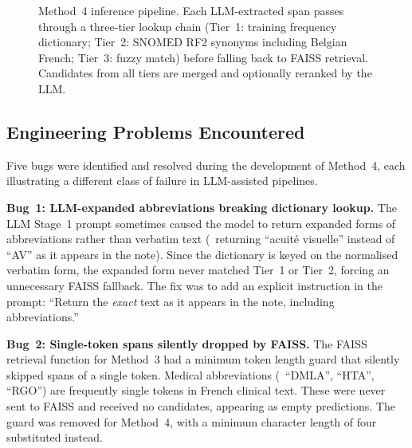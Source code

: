 \begin{figure}[htbp]
\caption{Method~4 inference pipeline. Each LLM-extracted span passes through a three-tier lookup chain (Tier~1: training frequency dictionary; Tier~2: SNOMED RF2 synonyms including Belgian French; Tier~3: fuzzy match) before falling back to FAISS retrieval. Candidates from all tiers are merged and optionally reranked by the LLM.}
\label{fig:m4_architecture}
\end{figure}

\subsection{Engineering Problems Encountered}

Five bugs were identified and resolved during the development of Method~4, each illustrating a different class of failure in LLM-assisted pipelines.

\textbf{Bug~1: LLM-expanded abbreviations breaking dictionary lookup.} The LLM Stage~1 prompt sometimes caused the model to return expanded forms of abbreviations rather than verbatim text (\eg\ returning ``acuité visuelle'' instead of ``AV'' as it appears in the note). Since the dictionary is keyed on the normalised verbatim form, the expanded form never matched Tier~1 or Tier~2, forcing an unnecessary FAISS fallback. The fix was to add an explicit instruction in the prompt: ``Return the \textit{exact} text as it appears in the note, including abbreviations.''

\textbf{Bug~2: Single-token spans silently dropped by FAISS.} The FAISS retrieval function for Method~3 had a minimum token length guard that silently skipped spans of a single token. Medical abbreviations (\eg\ ``DMLA'', ``HTA'', ``RGO'') are frequently single tokens in French clinical text. These were never sent to FAISS and received no candidates, appearing as empty predictions. The guard was removed for Method~4, with a minimum character length of four substituted instead.

